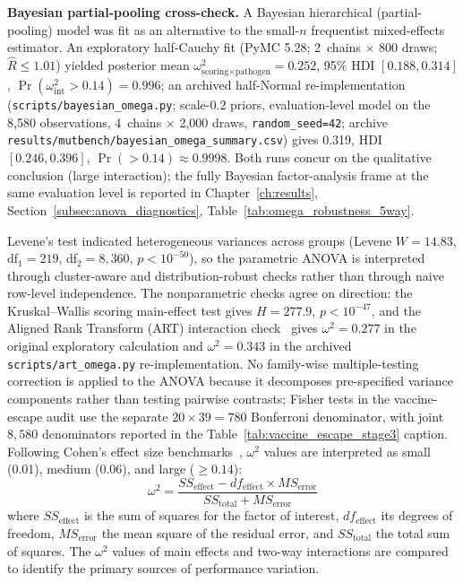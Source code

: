 \textbf{Bayesian partial-pooling cross-check.}\label{subsubsec:bayesian_methods} A Bayesian hierarchical (partial-pooling) model was fit as an alternative to the small-$n$ frequentist mixed-effects estimator. An exploratory half-Cauchy fit (PyMC 5.28; 2~chains $\times$ 800 draws; $\hat R \leq 1.01$) yielded posterior mean $\omega^2_{\text{scoring} \times \text{pathogen}} = 0.252$, 95\% HDI $[0.188, 0.314]$, $\Pr(\omega^2_{\text{int}} > 0.14) = 0.996$; an archived half-Normal re-implementation (\texttt{scripts/bayesian\_omega.py}; scale-0.2 priors, evaluation-level model on the 8{,}580 observations, 4~chains $\times$ 2{,}000 draws, \texttt{random\_seed=42}; archive \texttt{results/mutbench/bayesian\_omega\_summary.csv}) gives 0.319, HDI $[0.246, 0.396]$, $\Pr(>0.14) \approx 0.9998$. Both runs concur on the qualitative conclusion (large interaction); the fully Bayesian factor-analysis frame at the same evaluation level is reported in Chapter~\ref{ch:results}, Section~\ref{subsec:anova_diagnostics}, Table~\ref{tab:omega_robustness_5way}.

Levene's test indicated heterogeneous variances across groups (Levene $W = 14.83$, df$_1 = 219$, df$_2 = 8{,}360$, $p < 10^{-50}$), so the parametric ANOVA is interpreted through cluster-aware and distribution-robust checks rather than through naive row-level independence.
The nonparametric checks agree on direction: the Kruskal--Wallis scoring main-effect test gives $H = 277.9$, $p < 10^{-47}$, and the Aligned Rank Transform (ART) interaction check~\cite{wobbrock2011aligned} gives $\omega^2 = 0.277$ in the original exploratory calculation and $\omega^2 = 0.343$ in the archived \texttt{scripts/art\_omega.py} re-implementation.
No family-wise multiple-testing correction is applied to the ANOVA because it decomposes pre-specified variance components rather than testing pairwise contrasts; Fisher tests in the vaccine-escape audit use the separate $20\times39 = 780$ Bonferroni denominator, with joint $8{,}580$ denominators reported in the Table~\ref{tab:vaccine_escape_stage3} caption.
Following Cohen's effect size benchmarks~\cite{cohen1988statistical}, $\omega^2$ values are interpreted as small (0.01), medium (0.06), and large ($\geq 0.14$):
\begin{equation}
\omega^2 = \frac{SS_{\text{effect}} - df_{\text{effect}} \times MS_{\text{error}}}{SS_{\text{total}} + MS_{\text{error}}}
\label{eq:omega_squared}
\end{equation}
where $SS_{\text{effect}}$ is the sum of squares for the factor of interest, $df_{\text{effect}}$ its degrees of freedom, $MS_{\text{error}}$ the mean square of the residual error, and $SS_{\text{total}}$ the total sum of squares.
The $\omega^2$ values of main effects and two-way interactions are compared to identify the primary sources of performance variation.

